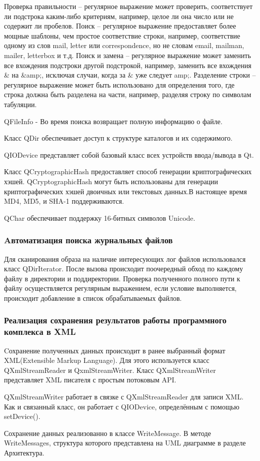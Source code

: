 Проверка правильности -- регулярное выражение может проверить, соответствует ли подстрока каким-либо критериям, например, целое ли она число или не содержит ли пробелов.
Поиск -- регулярное выражение предоставляет более мощные шаблоны, чем простое соответствие строки, например, соответствие одному из слов mail, letter или correspondence, но не словам email, mailman, mailer, letterbox и т.д.
Поиск и замена -- регулярное выражение может заменить все вхождения подстроки другой подстрокой, например, заменить все вхождения \& на \&amp;, исключая случаи, когда за \& уже следует amp;.
Разделение строки -- регулярное выражение может быть использовано для определения того, где строка должна быть разделена на части, например, разделяя строку по символам табуляции.

QFileInfo  - Во время поиска возвращает полную информацию о файле.

Класс QDir обеспечивает доступ к структуре каталогов и их содержимого.

QIODevice представляет собой базовый класс всех устройств ввода/вывода в Qt.

Класс QCryptographicHash предоставляет способ генерации криптографических хэшей.
QCryptographicHash могут быть использованы для генерации криптографических хэшей двоичных или текстовых данных.В настоящее время MD4, MD5, и SHA-1 поддерживаются.\cite{qtcross}

QChar обеспечивает поддержку 16-битных символов Unicode.

\subsubsection{Aвтоматизация поиска журнальных файлов}

Для сканирования образа на наличие интересующих лог файлов использовался класс QDirIterator. После вызова происходит поочередный обход по каждому файлу в директории и поддиректории. Проверка полученного полного пути к файлу осуществляется регулярным выражением, если условие выполняется, происходит добавление в список обрабатываемых файлов.

\subsubsection{Реализация сохранения результатов работы программного комплекса в XML}

Cохранение полученных данных происходит в ранее выбранный формат XML(Extensible Markup Language). Для этого используется класс QXmlStreamReader и QxmlStreamWriter.
Класс QXmlStreamWriter представляет XML писателя с простым потоковым API.

QXmlStreamWriter работает в связке с QXmlStreamReader для записи XML. Как и связанный класс, он работает с QIODevice, определённым с помощью setDevice().

Сохранение данных реализованно в классе WriteMessage. В методе WriteMessages, структура которого представлена на UML диаграмме в разделе Архитектура.
